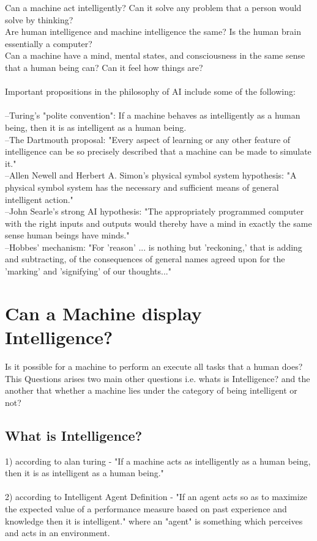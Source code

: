 \documentclass[a4paper]{article}
\begin{document}
    Can a machine act intelligently? Can it solve any problem that a person would solve by thinking?\\
    Are human intelligence and machine intelligence the same? Is the human brain essentially a computer?\\
    Can a machine have a mind, mental states, and consciousness in the same sense that a human being can? Can it feel how things are?\\
    \\
    Important propositions in the philosophy of AI include some of the following:\\
    \\
    --Turing's "polite convention": If a machine behaves as intelligently as a human being, then it is as intelligent as a human being.\\
    --The Dartmouth proposal: "Every aspect of learning or any other feature of intelligence can be so precisely described that a machine can be made to simulate it."\\
    --Allen Newell and Herbert A. Simon's physical symbol system hypothesis: "A physical symbol system has the necessary and sufficient means of general intelligent action."\\
    --John Searle's strong AI hypothesis: "The appropriately programmed computer with the right inputs and outputs would thereby have a mind in exactly the same sense human beings have minds."\\
    --Hobbes' mechanism: "For 'reason' ... is nothing but 'reckoning,' that is adding and subtracting, of the consequences of general names agreed upon for the 'marking' and 'signifying' of our thoughts..."\\
    
    \section{Can a Machine display Intelligence?}
    Is it possible for a machine to perform an execute all tasks that a human does?\\
    This Questions arises two main other questions i.e.  whats is Intelligence? and the another that whether a machine lies under the category of being intelligent or not?\\
    \subsection{What is Intelligence?}
    1) according to alan turing - "If a machine acts as intelligently as a human being, then it is as intelligent as a human being."\\
    \\
    2) according to Intelligent Agent Definition - "If an agent acts so as to maximize the expected value of a performance measure based on past experience and knowledge then it is intelligent." where an "agent" is something which perceives and acts in an environment.
    \bigskip
\end{document}
